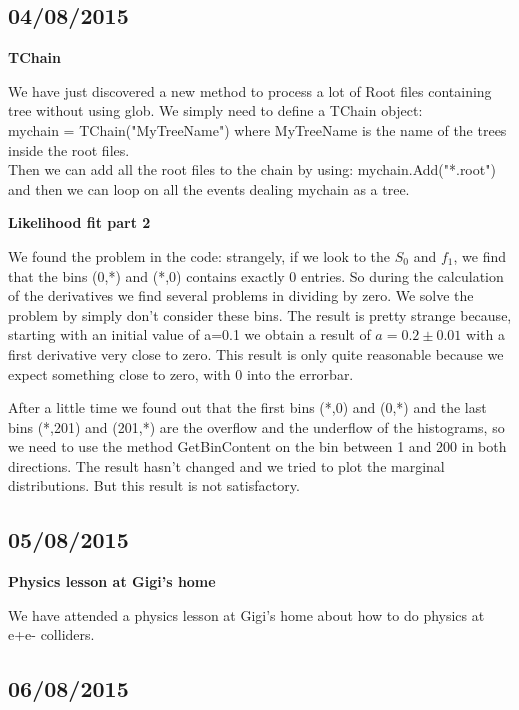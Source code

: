 \subsection{04/08/2015}

\textbf{TChain}

We have just discovered a new method to process a lot of Root files containing tree without using glob.
We simply need to define a TChain object:\\
mychain = TChain("MyTreeName")
where MyTreeName is the name of the trees inside the root files.\\
Then we can add all the root files to the chain by using:
mychain.Add("*.root")\\
and then we can loop on all the events dealing mychain as a tree.

\textbf{Likelihood fit part 2}

We found the problem in the code: strangely, if we look to the $S_0$ and $f_1$, we find that the bins (0,*) and (*,0) contains exactly 0 entries. So during the calculation of the derivatives we find several problems in dividing by zero. We solve the problem by simply don't consider these bins. The result is pretty strange because, starting with an initial value of a=0.1 we obtain a result of $a=0.2 \pm 0.01$ with a first derivative very close to zero. This result is only quite reasonable because we expect something close to zero, with 0 into the errorbar.

After a little time we found out that the first bins (*,0) and (0,*) and the last bins (*,201) and (201,*) are the overflow and the underflow of the histograms, so we need to use the method GetBinContent on the bin between 1 and 200 in both directions. The result hasn't changed and we tried to plot the marginal distributions. But this result is not satisfactory.

\subsection{05/08/2015}

\textbf{Physics lesson at Gigi's home}

We have attended a physics lesson at Gigi's home about how to do physics at e+e- colliders.

\subsection{06/08/2015}



